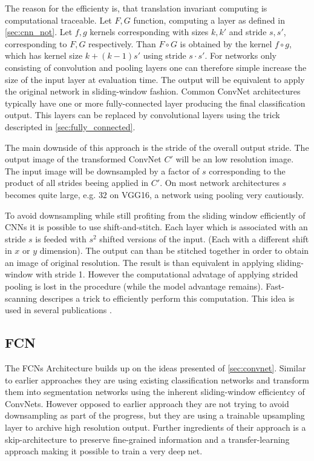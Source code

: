 The reason for the efficienty is, that translation invariant computing is computational traceable. Let $F, G$ function, computing a layer as defined in \cref{sec:cnn_not}. Let $f,g$ kernels corresponding with sizes $k,k'$ and stride $s,s'$, corresponding to $F, G$ respectively. Than $F \circ G$ is obtained by the kernel $f \circ g$, which has kernel size $k + (k-1) s'$ using stride $s \cdot s'$. For networks only consisting of convolution and pooling layers one can therefore simple increase the size of the input layer at evaluation time. The output will be equivalent to apply the original network in sliding-window fashion. Common ConvNet architectures typically have one or more fully-connected layer producing the final classification output. This layers can be replaced by convolutional layers using the trick descripted in \cref{sec:fully_connected}. 

The main downside of this approach is the stride of the overall output stride. The output image of the transformed ConvNet $C'$ will be an low resolution image. The input image will be downsampled by a factor of $s$ corresponding to the product of all strides beeing applied in $C'$. On most network architectures $s$ becomes quite large, e.g. $32$ on VGG16, a network using pooling very cautiously. 

To avoid downsampling while still profiting from the sliding window efficiently of \glspl{CNN} it is possible to use shift-and-stitch. Each layer which is associated with an stride $s$ is feeded with $s^2$ shifted versions of the input. (Each with a different shift in $x$ or $y$ dimension). The output can than be stitched together in order to obtain an image of original resolution. The result is than equivalent in applying sliding-window with stride 1. However the computational advatage of applying strided pooling is lost in the procedure (while the model advantage remains). Fast-scanning \cite{fast_scanning} descripes a trick to efficiently perform this computation.  This idea is used in several publications \cite{overfeat,huval}.


\subsection{FCN} \label{sec:fcn_detail}

The \glspl{FCN} \cite{fcn} Architecture builds up on the ideas presented of \cref{sec:convnet}. Similar to earlier approaches they are using existing classification networks and transform them into segmentation networks using the inherent sliding-window efficientcy of ConvNets. However opposed to earlier approach they are not trying to avoid downsampling as part of the progress, but they are using a trainable upsampling layer to archive high resolution output. Further ingredients of their approach is a skip-architecture to  preserve fine-grained information and a transfer-learning approach making it possible to train a very deep net.


